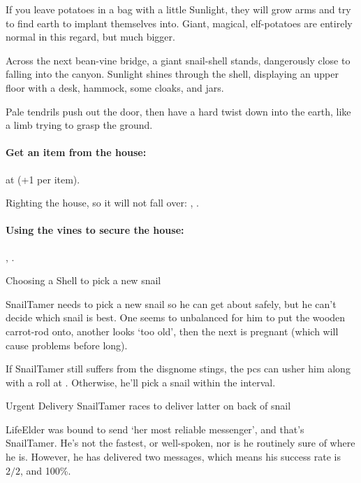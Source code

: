If you leave potatoes in a bag with a little Sunlight, they will grow arms and try to find earth to implant themselves into.
Giant, magical, elf-potatoes are entirely normal in this regard, but much bigger.

\begin{speechtext}
  Across the next bean-vine bridge, a giant snail-shell stands, dangerously close to falling into the canyon.
  Sunlight shines through the shell, displaying an upper floor with a desk, hammock, some cloaks, and jars.

  Pale tendrils push out the door, then have a hard twist down into the earth, like a limb trying to grasp the ground.
\end{speechtext}

\paragraph{Get an item from the house:}
 at \tn[12] (+1 per item).

Righting the house, so it will not fall over:
, \tn[12].

\paragraph{Using the vines to secure the house:}
, \tn[10].


{Choosing a Shell}%
{ to pick a new snail}%

\Gls{SnailTamer} needs to pick a new snail so he can get about safely, but he can't decide which snail is best.
One seems to unbalanced for him to put the wooden carrot-rod onto, another looks `too old', then the next is pregnant (which will cause problems before long).

If \gls{SnailTamer} still suffers from the \gls{disgnome} stings,
the \glspl{pc} can usher him along with a  roll at \tn[10].
Otherwise, he'll pick a snail within the \gls{interval}.

{Urgent Delivery}%
{\gls{SnailTamer} races to deliver latter on back of snail}%


\Gls{LifeElder} was bound to send `her most reliable messenger', and that's \gls{SnailTamer}.
He's not the fastest, or well-spoken, nor is he routinely sure of where he is.
However, he has delivered two messages, which means his success rate is $2/2$, and 100\%.

